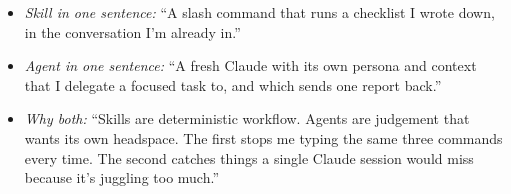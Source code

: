 \documentclass[10pt]{article}
\begin{document}
\begin{itemize}[leftmargin=1.4em, itemsep=0.15em]
  \item \textit{Skill in one sentence:} ``A slash command that runs a checklist I wrote down, in the conversation I'm already in.''
  \item \textit{Agent in one sentence:} ``A fresh Claude with its own persona and context that I delegate a focused task to, and which sends one report back.''
  \item \textit{Why both:} ``Skills are deterministic workflow. Agents are judgement that wants its own headspace. The first stops me typing the same three commands every time. The second catches things a single Claude session would miss because it's juggling too much.''
\end{itemize}
\end{document}
